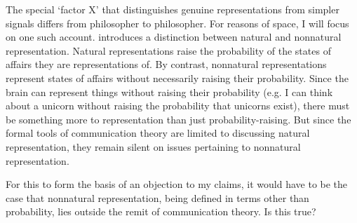 \documentclass[12pt]{article}
\begin{document}
The special `factor X' that distinguishes genuine representations from simpler signals differs from philosopher to philosopher.
For reasons of space, I will focus on one such account.
%
%
%
%
%
\citet{piccinini2020nonnatural} introduces a distinction between natural and nonnatural representation.
Natural representations raise the probability of the states of affairs they are representations of.
By contrast, nonnatural representations represent states of affairs without necessarily raising their probability.
Since the brain can represent things without raising their probability (e.g. I can think about a unicorn without raising the probability that unicorns exist), there must be something more to representation than just probability-raising.
But since the formal tools of communication theory are limited to discussing natural representation, they remain silent on issues pertaining to nonnatural representation.

For this to form the basis of an objection to my claims, it would have to be the case that nonnatural representation, being defined in terms other than probability, lies outside the remit of communication theory.
Is this true?
\end{document}
